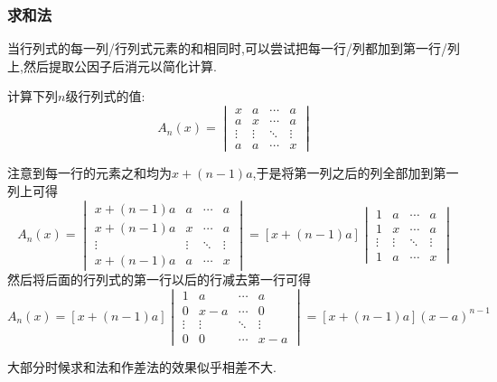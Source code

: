 \documentclass{ctexart}
\begin{document}
\subsubsection{求和法}
\begin{hint}
    当行列式的每一列/行列式元素的和相同时,可以尝试把每一行/列都加到第一行/列上,然后提取公因子后消元以简化计算.
\end{hint}
\begin{problem}
    计算下列$n$级行列式的值:
    \[A_n(x)=\begin{vmatrix}
        x&a&\cdots&a\\
        a&x&\cdots&a\\
        \vdots&\vdots&\ddots&\vdots\\
        a&a&\cdots&x
    \end{vmatrix}\]
\end{problem}
\begin{solution}
    注意到每一行的元素之和均为$x+(n-1)a$,于是将第一列之后的列全部加到第一列上可得
    \[A_n(x)=\begin{vmatrix}
        x+(n-1)a&a&\cdots&a\\
        x+(n-1)a&x&\cdots&a\\
        \vdots&\vdots&\ddots&\vdots\\
        x+(n-1)a&a&\cdots&x
    \end{vmatrix}=\left[x+(n-1)a\right]\begin{vmatrix}
        1&a&\cdots&a\\
        1&x&\cdots&a\\
        \vdots&\vdots&\ddots&\vdots\\
        1&a&\cdots&x
    \end{vmatrix}\]
    然后将后面的行列式的第一行以后的行减去第一行可得
    \[A_n(x)=\left[x+(n-1)a\right]\begin{vmatrix}
        1&a&\cdots&a\\
        0&x-a&\cdots&0\\
        \vdots&\vdots&\ddots&\vdots\\
        0&0&\cdots&x-a
    \end{vmatrix}=\left[x+(n-1)a\right](x-a)^{n-1}\]
\end{solution}
\begin{hint}
    大部分时候求和法和作差法的效果似乎相差不大.
\end{hint}
\end{document}
